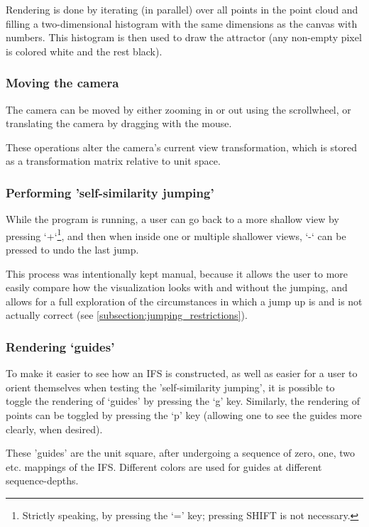 \documentclass[11pt]{article}
\begin{document}
Rendering is done by iterating (in parallel) over all points in the point cloud and filling a two-dimensional histogram with the same dimensions
as the canvas with numbers. 
This histogram is then used to draw the attractor (any non-empty pixel is colored white and the rest black).

\subsubsection{Moving the camera}
\label{sec:orgb80cc47}
The camera can be moved by either zooming in or out using the scrollwheel,
or translating the camera by dragging with the mouse.

These operations alter the camera's current view transformation, 
which is stored as a transformation matrix relative to unit space.

\subsubsection{Performing 'self-similarity jumping'}
\label{sec:org087b415}

While the program is running, a user can go back to a more shallow view by pressing `+`\footnote{Strictly speaking, by pressing the `=' key; pressing SHIFT is not necessary.}, and then when inside one or multiple shallower views,
`-` can be pressed to undo the last jump.

This process was intentionally kept manual, because it allows the user to more easily compare how
the visualization looks with and without the jumping, and allows for a full exploration of the circumstances
in which a jump up is and is not actually correct (see \autoref{subsection:jumping_restrictions}).
\subsubsection{Rendering `guides'}
\label{sec:org3f4c18e}

To make it easier to see how an IFS is constructed, as well as easier for a user to orient themselves when
testing the 'self-similarity jumping', it is possible to toggle the rendering of `guides' by pressing the `g' key.
Similarly, the rendering of points can be toggled by pressing the `p' key (allowing one to see the guides more clearly, when desired).

These 'guides' are the unit square, after undergoing a sequence of zero, one, two etc. mappings of the IFS.
Different colors are used for guides at different sequence-depths.
\end{document}
